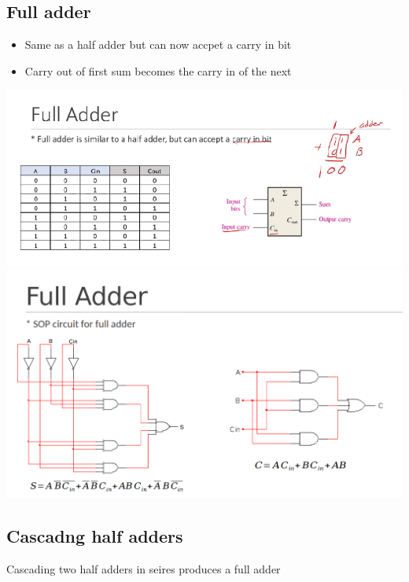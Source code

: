 \documentclass[a4paper,12pt]{article}
\begin{document}
        \subsection{Full adder}
            \begin{itemize}
                \item Same as a half adder but can now accpet a carry in bit
                \item Carry out of first sum becomes the carry in of the next
            \end{itemize}
            \includegraphics[width=15cm]{FullAdder1.png}\\
            \includegraphics[width=15cm]{FullAdder2.png}
            
            \subsection{Cascadng half adders}
                Cascading two half adders in seires produces a full adder
\end{document}
